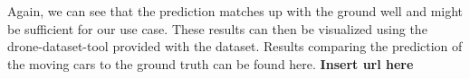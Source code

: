 Again, we can see that the prediction matches up with the ground well and might be sufficient for our use case.
These results can then be visualized using the drone-dataset-tool provided with the dataset.
Results comparing the prediction of the moving cars to the ground truth can be found here.
\textbf{Insert url here}
